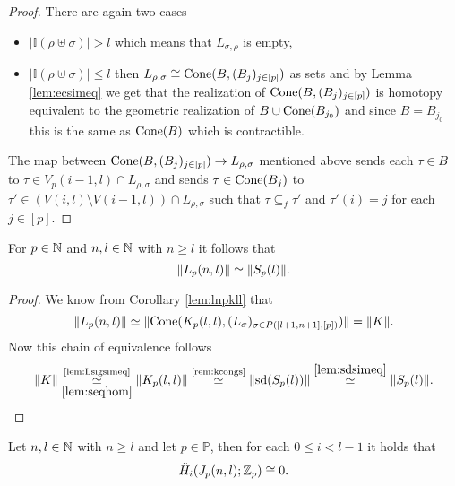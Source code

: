 \begin{proof}
  There are again two cases
  \begin{itemize}
    \item $\left|\mathbb{I}(\rho \uplus \sigma)\right| > l$ which means that $L_{\sigma,\rho}$ is empty,
    \item $\left|\mathbb{I}(\rho \uplus \sigma)\right| \leq l$ then $L_{\rho, \sigma} \cong {\rm Cone}(B, (B_j)_{j\in [p]})$ as sets and by Lemma \ref{lem:ecsimeq} we get that the realization of ${\rm Cone}(B, (B_j)_{j \in [p]})$ is homotopy equivalent to the geometric realization of $B \cup {\rm Cone}(B_{j_0})$ and since $B = B_{j_0}$ this is the same as ${\rm Cone}(B)$ which is contractible.
    \end{itemize}
    The map between ${\rm Cone}(B, (B_j)_{j\in [p]}) \to L_{\rho, \sigma}$ mentioned above sends each $\tau \in B$ to $\tau \in V_p(i-1, l) \cap L_{\rho, \sigma}$ and sends $\tau \in {\rm Cone}(B_j)$ to $\tau' \in (V(i,l) \setminus V(i-1,l))\cap L_{\rho,\sigma}$ such that $\tau \subseteq_f \tau'$ and $\tau'(i) = j$ for each $j \in [p]$.
\end{proof}

\begin{col}\label{col:lspl}
  For $p \in \mathbb{N}$ and $n,l\in \mathbb{N}$ with $n \geq l$ it follows that \[\lVert L_p(n,l) \rVert \simeq \lVert S_p(l) \rVert.\qedhere\]
\end{col}

\begin{proof}
  We know from Corollary \ref{lem:lnpkll} that \[\lVert L_p(n,l) \rVert \simeq \lVert{\rm Cone}(K_p(l,l), (L_\sigma)_{\sigma\in P([l+1,n+1],[p])})\rVert = \lVert K \rVert.\] Now this chain of equivalence follows
  \begin{equation*}
    \lVert K \rVert \underset{\ref{lem:seqhom}}{\overset{\text{\ref{lem:Lsigsimeq}}}{\simeq}} \lVert K_p(l,l) \rVert \overset{\text{\ref{rem:kcongs}}}{\simeq} \lVert {\rm sd}(S_p(l)) \rVert \overset{\ref{lem:sdsimeq}}{\simeq} \lVert S_p(l) \rVert.\qedhere
  \end{equation*}
\end{proof}

\begin{lemma}\label{lem:jc0}
  Let $n,l \in \mathbb{N}$ with $n \geq l$ and let $p \in \mathbb{P}$, then for each $0 \leq i < l-1$ it holds that
  \begin{equation*}
    \tilde{H}_i(J_p(n,l); \mathbb{Z}_p) \cong 0.
  \end{equation*}
\end{lemma}

